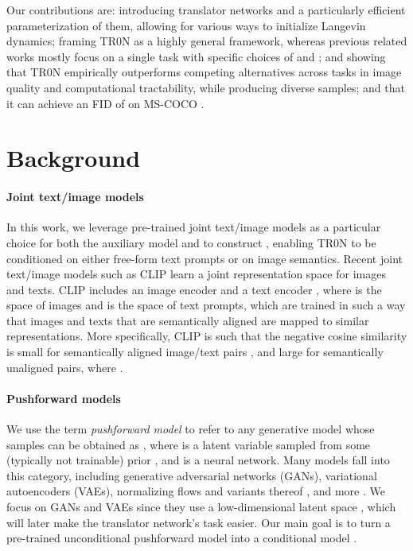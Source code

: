 \documentclass[nohyperref]{article}
\theoremstyle{plain}
\theoremstyle{definition}
\theoremstyle{remark}
\begin{document}
Our contributions are:  introducing translator networks and a particularly efficient parameterization of them, allowing for various ways to initialize Langevin dynamics;  framing TR0N as a highly general framework, whereas previous related works mostly focus on a single task with specific choices of  and ; and  showing that TR0N empirically outperforms competing alternatives across tasks in image quality and computational tractability, while producing diverse samples; and that it can achieve an FID \citep{Heusel2017GANsTB} of  on MS-COCO \citep{lin2014microsoft}.
 
\section{Background}
\paragraph{Joint text/image models} In this work, we leverage pre-trained joint text/image models as a particular choice for both the auxiliary model  and to construct , enabling TR0N to be conditioned on either free-form text prompts or on image semantics. 
Recent joint text/image models such as CLIP learn a joint representation space  for images and texts. 
CLIP includes an image encoder  and a text encoder , where  is the space of images and  is the space of text prompts, which are trained in such a way that images and texts that are semantically aligned are mapped to similar representations. 
More specifically, CLIP is such that the negative cosine similarity  is small for semantically aligned image/text pairs , and large for semantically unaligned pairs, where .


\paragraph{Pushforward models} We use the term \emph{pushforward model} to refer to any generative model whose samples  can be obtained as , where  is a latent variable sampled from some (typically not trainable) prior , and  is a neural network. 
Many models fall into this category, including generative adversarial networks (GANs), variational autoencoders (VAEs), normalizing flows \citep{dinh2016density, durkan2019neural} and variants thereof \citep{brehmer2020flows, caterini2021rectangular, ross2021tractable}, and more \citep{tolstikhin2017wasserstein,loaiza2022diagnosing}. We focus on GANs and VAEs since they use a low-dimensional latent space , which will later make the translator network's task easier. Our main goal is to turn a pre-trained unconditional pushforward model  into a conditional model .
\end{document}
